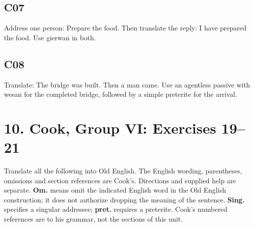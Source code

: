 \subsection*{C07}

\par\begin{minipage}{\linewidth}\raggedright
Address one person: Prepare the food. Then translate the reply: I have prepared the food. Use gierwan in both.

\end{minipage}\par\addvspace{4pt}

\subsection*{C08}

\par\begin{minipage}{\linewidth}\raggedright
Translate: The bridge was built. Then a man came. Use an agentless passive with wesan for the completed bridge, followed by a simple preterite for the arrival.

\end{minipage}\par\addvspace{4pt}

\section*{10. Cook, Group VI: Exercises 19–21}

Translate all the following into Old English. The English wording, parentheses, omissions and section references are Cook’s. Directions and supplied help are separate. \textbf{Om.} means omit the indicated English word in the Old English construction; it does not authorize dropping the meaning of the sentence. \textbf{Sing.} specifies a singular addressee; \textbf{pret.} requires a preterite. Cook’s numbered references are to his grammar, not the sections of this unit.

